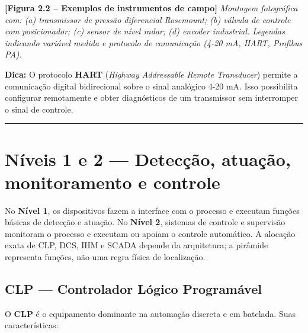 \begin{caixafigura}

\textbf{{[}Figura 2.2 -- Exemplos de instrumentos de campo{]}}
\emph{Montagem fotográfica com: (a) transmissor de pressão diferencial Rosemount; (b) válvula de controle com posicionador; (c) sensor de nível radar; (d) encoder industrial. Legendas indicando variável medida e protocolo de comunicação (4-20 mA, HART, Profibus PA).}

\end{caixafigura}

\begin{caixadica}

\textbf{Dica:} O protocolo \textbf{HART} (\emph{Highway Addressable Remote Transducer}) permite a comunicação digital bidirecional sobre o sinal analógico 4-20 mA. Isso possibilita configurar remotamente e obter diagnósticos de um transmissor sem interromper o sinal de controle.

\end{caixadica}

\begin{center}\rule{0.5\linewidth}{0.5pt}\end{center}

\section{\texorpdfstring{Níveis 1 e 2 --- Detecção, atuação, monitoramento e controle}{Níveis 1 e 2  Detecção, atuação, monitoramento e controle}}\label{nuxedveis-1-e-2-detecuxe7uxe3o-atuauxe7uxe3o-monitoramento-e-controle}

No \textbf{Nível 1}, os dispositivos fazem a interface com o processo e executam funções básicas de detecção e atuação. No \textbf{Nível 2}, sistemas de controle e supervisão monitoram o processo e executam ou apoiam o controle automático. A alocação exata de CLP, DCS, IHM e SCADA depende da arquitetura; a pirâmide representa funções, não uma regra física de localização.

\subsection{\texorpdfstring{CLP --- Controlador Lógico Programável}{CLP  Controlador Lógico Programável}}\label{clp-controlador-luxf3gico-programuxe1vel}

O \textbf{CLP} é o equipamento dominante na automação discreta e em batelada. Suas características:

